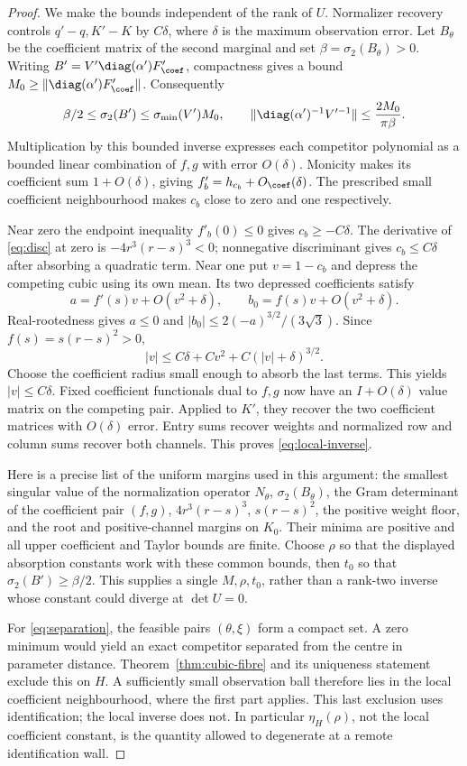 \begin{proof}
We make the bounds independent of the rank of $U$. Normalizer recovery
controls $q'-q,K'-K$ by $C\delta$, where $\delta$ is the maximum
observation error. Let $B_\theta$ be the coefficient matrix of the second
marginal and set $\beta=\sigma_2(B_\theta)>0$. Writing
$B'=V'\diag(\alpha')F'_{\coef}$, compactness gives a bound
$M_0\ge\|\diag(\alpha')F'_{\coef}\|$. Consequently
\[
 \beta/2\le\sigma_2(B')\le\sigma_{\min}(V')M_0,
 \qquad \|\diag(\alpha')^{-1}V'^{-1}\|
                   \le\frac{2M_0}{\pi\beta}.
\]
Multiplication by this bounded inverse expresses each competitor
polynomial as a bounded linear combination of $f,g$ with error $O(\delta)$.
Monicity makes its coefficient sum $1+O(\delta)$, giving
$f'_b=h_{c_b}+O_{\coef}(\delta)$. The prescribed small coefficient
neighbourhood makes $c_b$ close to zero and one respectively.

Near zero the endpoint inequality $f'_b(0)\le0$ gives $c_b\ge-C\delta$.
The derivative of \eqref{eq:disc} at zero is $-4r^3(r-s)^3<0$;
nonnegative discriminant gives $c_b\le C\delta$ after absorbing a
quadratic term. Near one put $v=1-c_b$ and depress the competing cubic
using its own mean. Its two depressed coefficients satisfy
\[
 a=f'(s)v+O(v^2+\delta),\qquad b_0=f(s)v+O(v^2+\delta).
\]
Real-rootedness gives $a\le0$ and
$|b_0|\le2(-a)^{3/2}/(3\sqrt3)$. Since $f(s)=s(r-s)^2>0$,
\[
 |v|\le C\delta+Cv^2+C(|v|+\delta)^{3/2}.
\]
Choose the coefficient radius small enough to absorb the last terms.
This yields $|v|\le C\delta$. Fixed coefficient functionals dual to
$f,g$ now have an $I+O(\delta)$ value matrix on the competing pair.
Applied to $K'$, they recover the two coefficient matrices with
$O(\delta)$ error. Entry sums recover weights and normalized row and
column sums recover both channels. This proves \eqref{eq:local-inverse}.

Here is a precise list of the uniform margins used in this argument:
the smallest singular value of the normalization operator $N_\theta$,
$\sigma_2(B_\theta)$, the Gram determinant of the coefficient pair
$(f,g)$, $4r^3(r-s)^3$, $s(r-s)^2$, the positive weight floor, and
the root and positive-channel margins on $K_0$. Their minima are positive
and all upper coefficient and Taylor bounds are finite. Choose $\rho$
so that the displayed absorption constants work with these common
bounds, then $t_0$ so that $\sigma_2(B')\ge\beta/2$. This supplies a
single $M,\rho,t_0$, rather than a rank-two inverse whose constant
could diverge at $\det U=0$.

For \eqref{eq:separation}, the feasible pairs $(\theta,\xi)$ form a
compact set. A zero minimum would yield an exact competitor separated
from the centre in parameter distance. Theorem~\ref{thm:cubic-fibre}
and its uniqueness statement exclude this on $H$. A sufficiently small
observation ball therefore lies in the local coefficient neighbourhood,
where the first part applies. This last exclusion uses identification;
the local inverse does not. In particular $\eta_H(\rho)$, not the local
coefficient constant, is the quantity allowed to degenerate at a remote
identification wall.
\end{proof}

